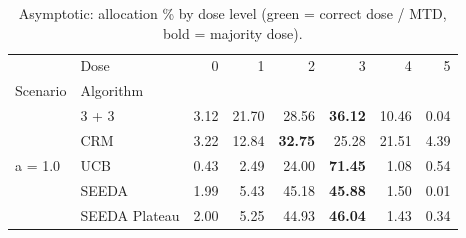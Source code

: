 \begin{table}[H]
\centering
\caption{Asymptotic: allocation \% by dose level (green = correct dose / MTD, bold = majority dose).}
\label{tab:asym_alloc_by_dose}
\begin{tabular}{llrrrrrr}
\toprule
 & Dose & 0 & 1 & 2 & 3 & 4 & 5 \\
Scenario & Algorithm &  &  &  &  &  &  \\
\midrule
\multirow[c]{5}{*}{a = 1.0} & 3 + 3 & 3.12 & 21.70 & {\cellcolor[HTML]{C8E6C9}} 28.56 & \bfseries 36.12 & 10.46 & 0.04 \\
 & CRM & 3.22 & 12.84 & {\cellcolor[HTML]{C8E6C9}} \bfseries 32.75 & 25.28 & 21.51 & 4.39 \\
 & UCB & 0.43 & 2.49 & {\cellcolor[HTML]{C8E6C9}} 24.00 & \bfseries 71.45 & 1.08 & 0.54 \\
 & SEEDA & 1.99 & 5.43 & {\cellcolor[HTML]{C8E6C9}} 45.18 & \bfseries 45.88 & 1.50 & 0.01 \\
 & SEEDA Plateau & 2.00 & 5.25 & {\cellcolor[HTML]{C8E6C9}} 44.93 & \bfseries 46.04 & 1.43 & 0.34 \\
\bottomrule
\end{tabular}
\end{table}

